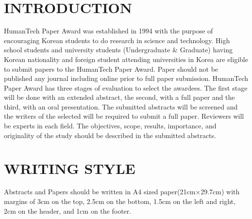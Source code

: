 \documentclass{abstract_hutech}
\begin{document}
\newpage
\clearpage
\setcounter{page}{1}
\thispagestyle{firstpage}

\section{INTRODUCTION}
HumanTech Paper Award was established in 1994 with the purpose of encouraging Korean students to do research in science and technology. High school students and university students (Undergraduate \& Graduate) having Korean nationality and foreign student attending universities in Korea are eligible to submit papers to the HumanTech Paper Award. Paper should not be published any journal including online prior to full paper submission. HumanTech Paper Award has three stages of evaluation to select the awardees. The first stage will be done with an extended abstract, the second, with a full paper and the third, with an oral presentation. The submitted abstracts will be screened and the writers of the selected will be required to submit a full paper. Reviewers will be experts in each field. The objectives, scope, results, importance, and originality of the study should be described in the submitted abstracts.

\section{WRITING STYLE}
Abstracts and Papers should be written in A4 sized paper(21cm$\times$29.7cm) with margins of 3cm on the top, 2.5cm on the bottom, 1.5cm on the left and right, 2cm on the header, and 1cm on the footer.
\end{document}
